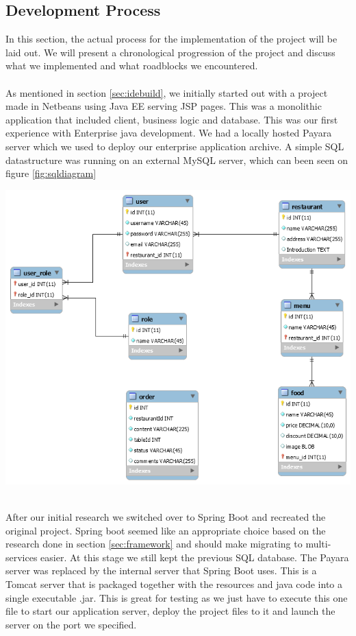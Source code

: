 \documentclass[12pt]{article}
\newenvironment{Figure}
	{\par\medskip\noindent\minipage{\linewidth}}
	{\endminipage\par\medskip}
\begin{document}
\begin{multicols}{2}
\subsection{Development Process}
In this section, the actual process for the implementation of the project will be laid out. We will present a chronological progression of the project and discuss what we implemented and what roadblocks we encountered.
\\\\
As mentioned in section \ref{sec:idebuild}, we initially started out with a project made in Netbeans using Java EE serving JSP pages. This was a monolithic application that included client, business logic and database. This was our first experience with Enterprise java development. We had a locally hosted Payara server which we used to deploy our enterprise application archive. A simple SQL datastructure was running on an external MySQL server, which can been seen on figure \ref{fig:sqldiagram}
\begin{Figure}
	\centering
	\includegraphics[width=\linewidth]{illustrations/database.png}
	\label{fig:sqldiagram}
\end{Figure}
\noindent \\After our initial research we switched over to Spring Boot and recreated the original project. Spring boot seemed like an appropriate choice based on the research done in section \ref{sec:framework} and should make migrating to multi-services easier. At this stage we still kept the previous SQL database. The Payara server was replaced by the internal server that Spring Boot uses. This is a Tomcat server that is packaged together with the resources and java code into a single executable .jar. This is great for testing as we just have to execute this one file to start our application server, deploy the project files to it and launch the server on the port we specified.

\end{multicols}
\end{document}
